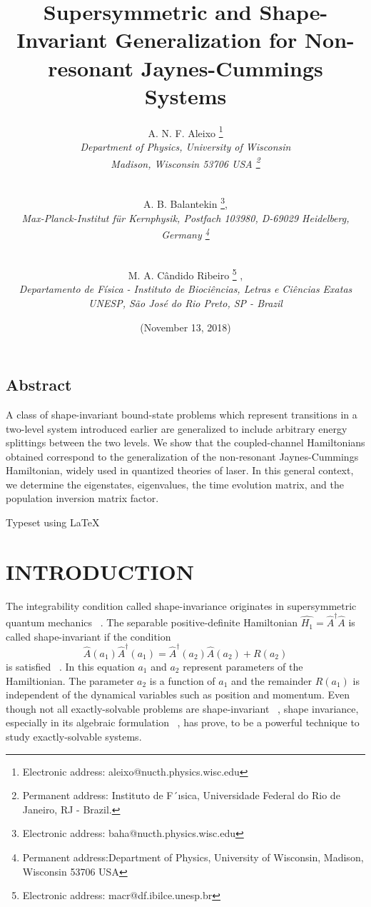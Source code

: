 \documentclass[a4paper, 10pt]{article}
\title{ \bf Supersymmetric and Shape-Invariant Generalization for
Non-resonant Jaynes-Cummings Systems}
\author{A. N. F. Aleixo \footnote{Electronic address: aleixo@nucth.physics.wisc.edu} \\
\it Department of Physics, University of Wisconsin \\
\it Madison, Wisconsin 53706 USA  \footnote{Permanent address: Instituto de F´ısica, Universidade Federal do Rio de Janeiro, RJ - Brazil.}
\and \\
A. B. Balantekin \footnote{Electronic address: baha@nucth.physics.wisc.edu}\smallskip, \\
\it Max-Planck-Institut für Kernphysik, Postfach 103980, D-69029 Heidelberg, Germany \footnote{Permanent address:Department of Physics, University of Wisconsin, Madison, Wisconsin 53706
USA}
\and \\ 
M. A. Cândido Ribeiro \footnote{Electronic address: macr@df.ibilce.unesp.br} \smallskip, \\
\it Departamento de F\'isica - Instituto de Biociências, Letras e Ciências Exatas \\
UNESP, S\~ao José do Rio Preto, SP - Brazil}
\date{(November 13, 2018)}
\numberwithin{equation}{section}
\begin{document}
\maketitle
\reversemarginpar
{}

\begin{center}
    \section*{Abstract}
\end{center}

A class of shape-invariant bound-state problems which represent transitions
in a two-level system introduced earlier are generalized to include arbitrary
energy splittings between the two levels. We show that the coupled-channel
Hamiltonians obtained correspond to the generalization of the non-resonant
Jaynes-Cummings Hamiltonian, widely used in quantized theories of laser.
In this general context, we determine the eigenstates, eigenvalues, the time
evolution matrix, and the population inversion matrix factor.\\

\begin{flushright}
    Typeset using \LaTeX
\end{flushright}

\newpage
\begin{center}
     \bf \section{INTRODUCTION}
\end{center}

The integrability condition called shape-invariance originates in supersymmetric quantum mechanics ~\cite{[1, 2]}. The separable positive-definite Hamiltonian $ \hat{H_1} = \hat{A}^{\dagger} \hat{A} $ is called shape-invariant if the condition 
\begin{equation}
     \hat{A}(a_1) \hat{A}^{\dagger}(a_1) = \hat{A}^{\dagger}(a_2) \hat{A}(a_2) + R(a_2) 
\end{equation}
is satisfied ~\cite{[3]}. In this equation $a_1$ and $a_2$ represent parameters of the Hamiltionian. The parameter $a_2$ is a function of $a_1$ and the remainder $R(a_1)$ is independent of the dynamical variables such as position and momentum. Even though not all exactly-solvable problems are shape-invariant ~\cite{[4]}, shape invariance, especially in its algebraic formulation ~\cite{[5, 7]}, has prove, to be a powerful technique to study exactly-solvable systems.\\
\vspace{0,5cm}
\end{document}
